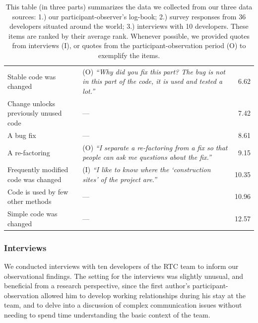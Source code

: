 \documentclass[12pt,oneside]{book}
\begin{document}
\begin{table}[th!]
{\begin{tabular}{l@{\hspace{0pt}}l@{\hspace{-15pt}}r}
Stable code was changed &(O) {\small\emph{``Why did you fix this part? The bug is not in this part of the code, it is used and tested a lot.''}}& 6.62\\%
Change unlocks previously unused code &--- & 7.42\\%
A bug fix &--- & 8.61\\%
A re-factoring &(O) \emph{``I separate a re-factoring from a fix so that people can ask me questions about the fix.''}& 9.15\\%
Frequently modified code was changed &(I) \emph{``I like to know where the `construction sites' of the project are.''}& 10.35\\%
Code is used by few other methods &--- & 10.96\\%
Simple code was changed\phantom{abcdefgheabcdefghe} &--- & 12.57\\%
\bottomrule
\end{tabular}
\label{tab:sub-technical}
}
\vspace{-10pt}
\caption{This table (in three parts) summarizes the data we collected from our three data sources: 1.) our participant-observer's log-book; 2.) survey responses from 36 developers situated around the world; 3.) interviews with 10 developers.  These items are ranked by their average rank.  Whenever possible, we provided quotes from interviews (I), or quotes from the participant-observation period (O) to exemplify the items.}
\addtocounter{table}{-1}
\label{tab:surveyfactors}
\end{table}

\subsubsection{Interviews}

We conducted interviews with ten developers of the RTC team to inform our observational findings. The setting for the interviews was slightly unusual, and beneficial from a research perspective, since the first author's participant-observation allowed him to develop working relationships during his stay at the team, and to delve into a discussion of complex communication issues without needing to spend time understanding the basic context of the team.
\end{document}
